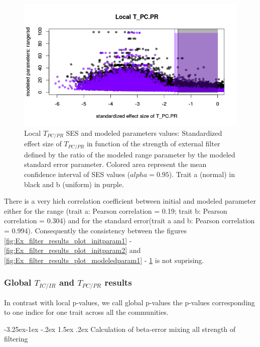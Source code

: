 \documentclass[12pt]{article}\usepackage[]{graphicx}\usepackage[]{color}
\makeatletter
\def\maxwidth{ %
  \ifdim\Gin@nat@width>\linewidth
    \linewidth
  \else
    \Gin@nat@width
  \fi
}
\newenvironment{knitrout}{}{} %
\newcounter {subsubsubsection}[subsubsection]
\newcommand\subsubsubsection{\@startsection{subsubsubsection}{4}{\z@}%
          {-3.25ex\@plus -1ex \@minus -.2ex}%
          {1.5ex \@plus .2ex}%
          {\normalfont\normalsize\bfseries}}
\makeatother
\begin{document}
\begin{knitrout}
\begin{figure}
{\centering \includegraphics[width=\maxwidth]{figure/Ex_filter_results_plot_modeledparam2-1} 

}

\caption[Local $T_{PC/PR}$ SES and modeled parameters values]{Local $T_{PC/PR}$ SES and modeled parameters values: Standardized effect size of $T_{PC/PR}$ in function of the strength of external filter defined by the ratio of the modeled range parameter by the modeled standard error parameter. Colored area represent the mean confidence interval of SES values ($alpha = 0.95$). Trait a (normal) in black and b (uniform) in purple.}\label{fig:Ex_filter_results_plot_modeledparam2}
\end{figure}


\end{knitrout}

There is a very hich correlation coefficient between initial and modeled parameter either for the range (trait a: Pearson correlation = 0.19; trait b: Pearson correlation = 0.304) and for the standard error(trait a and b: Pearson correlation = 0.994). Consequently the consistency between the figures \ref{fig:Ex_filter_results_plot_initparam1} - \ref{fig:Ex_filter_results_plot_initparam2} and \ref{fig:Ex_filter_results_plot_modeledparam1} - \ref{fig:Ex_filter_results_plot_modeledparam2} is not suprising. 
 
 \subsubsection {Global $T_{IC/IR}$ and $T_{PC/PR}$ results}
 
In contrast with local p-values, we call global p-values the p-values corresponding to one indice for one trait across all the communities. 
 
  \subsubsubsection {Calculation of beta-error mixing all strength of filtering}
 
\end{document}
